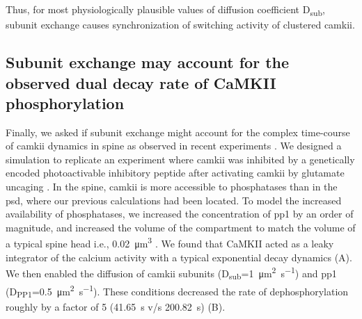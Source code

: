 \documentclass[9pt,lineno,doublespacing]{elife}
\newcommand\SUB[2]{#1\textsubscript{#2}}
\begin{document}
Thus, for most physiologically plausible values of diffusion coefficient
\SUB{D}{sub}, subunit exchange causes synchronization of switching activity of
clustered \gls{camkii}.

\subsection{Subunit exchange may account for the observed dual decay rate of
    CaMKII phosphorylation}\label{subsec:camkii_decay_two_time_course}

Finally, we asked if subunit exchange might account for the complex time-course
of \gls{camkii} dynamics in spine as observed in recent experiments
\citep{chang_camkii_2017}. We designed a simulation to replicate an experiment
where \gls{camkii} was inhibited by a genetically encoded photoactivable
inhibitory peptide after activating \gls{camkii} by glutamate uncaging
\citep{murakoshi_kinetics_2017}. In the spine, \gls{camkii} is more accessible
to phosphatases than in the \gls{psd}, where our previous calculations had been
located. To model the increased availability of phosphatases, we increased the
concentration of \gls{pp1} by an order of magnitude, and increased the volume of
the compartment to match the volume of a typical spine head i.e.,
\SI{0.02}{\cubic\micro\meter} \citep{bartol_nanoconnectomic_2015}. We found that
CaMKII acted as a leaky integrator of the calcium activity with a typical
exponential decay dynamics (A). We then enabled the
diffusion of \gls{camkii} subunits
(\SUB{D}{sub}=\SI{1}{\micro\meter\squared\per\second}) and \gls{pp1}
(\SUB{D}{PP1}=\SI{0.5}{\micro\meter\squared\per\second}). These conditions
decreased the rate of dephosphorylation roughly by a factor of 5
(\SI{41.65}{\second} v/s \SI{200.82}{\second}) (B). 
\end{document}
